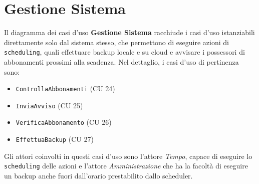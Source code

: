 \documentclass{article}
\begin{document}
	
	


















































































	
	
	
	\newpage 

\section{Gestione Sistema}

\indent\indent Il diagramma dei casi d'uso \textbf{Gestione Sistema} racchiude i casi d'uso istanziabili direttamente solo dal sistema stesso, che permettono di eseguire azioni di \texttt{scheduling}, quali effettuare backup locale e su cloud e avvisare i possessori di abbonamenti prossimi alla scadenza. Nel dettaglio, i casi d'uso di pertinenza sono:
\medskip
\begin{itemize}[itemsep=4pt]
  \item \texttt{ControllaAbbonamenti} (CU 24)
  \item \texttt{InviaAvviso} (CU 25)
  \item \texttt{VerificaAbbonamento} (CU 26)
  \item \texttt{EffettuaBackup} (CU 27)
\end{itemize}
\medskip
Gli attori coinvolti in questi casi d'uso sono l'attore \emph{Tempo}, capace di eseguire lo \texttt{scheduling} delle azioni e l'attore \emph{Amministrazione} che ha la facoltà di eseguire un backup anche fuori dall'orario prestabilito dallo scheduler.
\end{document}
